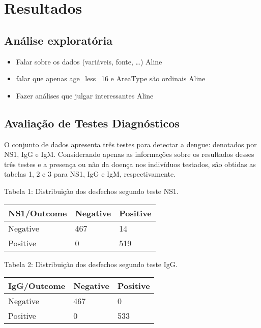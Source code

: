 \documentclass[
]{article}
\providecommand{\tightlist}{%
  \setlength{\itemsep}{0pt}\setlength{\parskip}{0pt}}
\begin{document}
\hypertarget{resultados}{%
\section{Resultados}\label{resultados}}

\hypertarget{anuxe1lise-exploratuxf3ria}{%
\subsection{Análise exploratória}\label{anuxe1lise-exploratuxf3ria}}

\begin{itemize}
\tightlist
\item
  Falar sobre os dados (variáveis, fonte, \ldots) Aline
\item
  falar que apenas age\_less\_16 e AreaType são ordinais Aline
\item
  Fazer análises que julgar interessantes Aline
\end{itemize}

\hypertarget{avaliauxe7uxe3o-de-testes-diagnuxf3sticos}{%
\subsection{Avaliação de Testes
Diagnósticos}\label{avaliauxe7uxe3o-de-testes-diagnuxf3sticos}}

O conjunto de dados apresenta três testes para detectar a dengue:
denotados por NS1, IgG e IgM. Considerando apenas as informações sobre
os resultados desses três testes e a presença ou não da doença nos
indivíduos testados, são obtidas as tabelas 1, 2 e 3 para NS1, IgG e
IgM, respectivamente.

Tabela 1: Distribuição dos desfechos segundo teste NS1.

\begin{longtable}[]{@{}lll@{}}
\toprule\noalign{}
NS1/Outcome & Negative & Positive \\
\midrule\noalign{}
\endhead
\bottomrule\noalign{}
\endlastfoot
Negative & 467 & 14 \\
Positive & 0 & 519 \\
\end{longtable}

Tabela 2: Distribuição dos desfechos segundo teste IgG.

\begin{longtable}[]{@{}lll@{}}
\toprule\noalign{}
IgG/Outcome & Negative & Positive \\
\midrule\noalign{}
\endhead
\bottomrule\noalign{}
\endlastfoot
Negative & 467 & 0 \\
Positive & 0 & 533 \\
\end{longtable}
\end{document}
